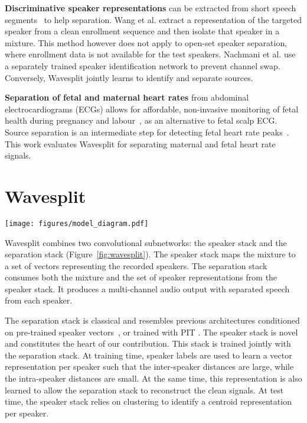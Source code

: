 \documentclass[letterpaper, onecolumn,10 pt]{IEEEtran}
\begin{document}
{\bf Discriminative speaker representations} can be extracted from short speech segments~\cite{wan18:verif,zeghidour16:siamese} to help separation.  
Wang et al. \cite{wang18:voicefilter} extract a representation of the targeted speaker from a clean enrollment sequence and then isolate that speaker in a mixture. This method however does not apply to open-set speaker separation, where enrollment data is not available for the test speakers. Nachmani et al. \cite{nachmani2020voice} use a separately trained speaker identification network to prevent channel swap. Conversely, Wavesplit jointly learns to identify and separate sources.

{\bf Separation of fetal and maternal heart rates} from abdominal electrocardiograms (ECGs) allows for affordable, non-invasive monitoring of fetal health during pregnancy and labour~\cite{bernardes2010persistent, karvounis2010non}, as an alternative to fetal scalp ECG. Source separation is an intermediate step for detecting fetal heart rate peaks~\cite{silva2013noninvasive, sutha2018fetal}. This work evaluates Wavesplit for separating maternal and fetal heart rate signals.

\section{Wavesplit}
\label{sec:wavesplit}

\begin{figure*} 
  \begin{center}
  \texttt{[image: figures/model\_diagram.pdf]}
  \end{center}
  \caption{Wavesplit for 2-speaker separation. The speaker stack extracts speaker vectors at each timestep. The vectors are clustered and aggregated into speaker centroids. The separation stack ingests the centroids and the input mixture to output two clean channels.}
  \label{fig:wavesplit}
 \end{figure*}

Wavesplit combines two convolutional subnetworks: the speaker stack and the separation stack (Figure~\ref{fig:wavesplit}). The speaker stack maps the mixture to a set of vectors representing the recorded speakers. The separation stack consumes both the mixture and the set of speaker representations from the speaker stack. It produces a multi-channel audio output with separated speech from each speaker.

The separation stack is classical and resembles previous architectures conditioned on
pre-trained speaker vectors~\cite{wang18:voicefilter}, or trained with PIT \cite{luo19:tasnet}. The speaker stack is novel and constitutes the heart of our contribution. This stack is trained jointly with the separation stack. At training time, speaker labels are used to learn a vector representation per speaker such that the inter-speaker distances are large, while the intra-speaker distances are small. At the same time, this representation is also learned to allow the separation stack to reconstruct the clean signals. At test time, the speaker stack relies on clustering to identify a centroid representation per speaker.
\end{document}
